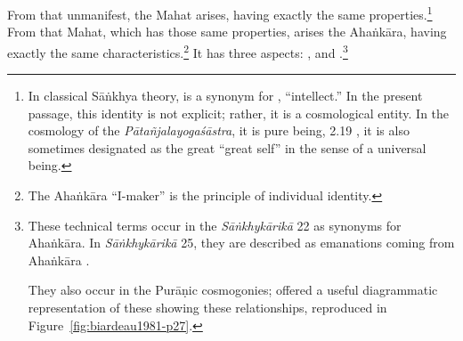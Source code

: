 \begin{translation}
From that unmanifest, the Mahat arises, having exactly the same
properties.\footnote{In classical Sāṅkhya theory,  is a
    synonym for , ``intellect.''  In the present passage, this
    identity is not explicit; rather, it is a cosmological entity.  In the
    cosmology of the \emph{Pātañjalayogaśāstra}, it is pure being,
     2.19 \citep[85]{agas-1904}, it is also sometimes
    designated as the great  ``great self'' in the sense of a
    universal being.} %
    From that Mahat, which has those same properties, arises the
    Ahaṅkāra, having exactly the same characteristics.\footnote{The
        Ahaṅkāra ``I-maker'' is the principle of individual identity.}  It
        has three aspects: , 
        and .\footnote{\label{puraniccosmology}These 
        technical terms occur in the \emph{Sāṅkhykārikā} 22 as synonyms for 
        Ahaṅkāra.  In \emph{Sāṅkhykārikā} 25, they are described as emanations 
        coming from Ahaṅkāra  
        \parencites[46--47, 50]{sast-1948}[187--188, 195--196]{wezl-1998}. 
       
            They 
        also occur in the Purāṇic cosmogonies; \citet[27]{biar-1981} offered a 
        useful diagrammatic representation of these showing these relationships, 
        reproduced in Figure~\ref{fig:biardeau1981-p27}.}
          
            \begin{figure}
                \centering\large
\end{figure}
\end{translation}
